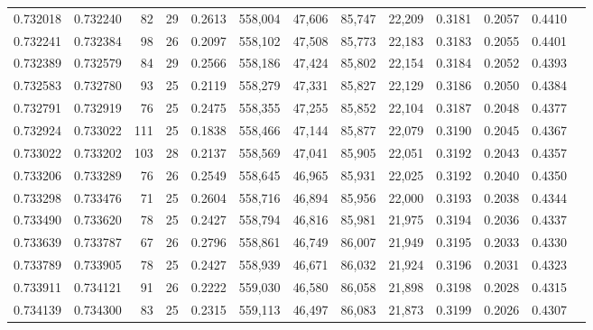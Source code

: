 \begin{tabular}{rrrrrrrrrrrrr}
0.732018 & 0.732240 &    82 &  29 &                                     0.2613 & 558,004 &  47,606 &  85,747 &  22,209 & 0.3181 & 0.2057 & 0.4410 \\
0.732241 & 0.732384 &    98 &  26 &                                     0.2097 & 558,102 &  47,508 &  85,773 &  22,183 & 0.3183 & 0.2055 & 0.4401 \\
0.732389 & 0.732579 &    84 &  29 &                                     0.2566 & 558,186 &  47,424 &  85,802 &  22,154 & 0.3184 & 0.2052 & 0.4393 \\
0.732583 & 0.732780 &    93 &  25 &                                     0.2119 & 558,279 &  47,331 &  85,827 &  22,129 & 0.3186 & 0.2050 & 0.4384 \\
0.732791 & 0.732919 &    76 &  25 &                                     0.2475 & 558,355 &  47,255 &  85,852 &  22,104 & 0.3187 & 0.2048 & 0.4377 \\
0.732924 & 0.733022 &   111 &  25 &                                     0.1838 & 558,466 &  47,144 &  85,877 &  22,079 & 0.3190 & 0.2045 & 0.4367 \\
0.733022 & 0.733202 &   103 &  28 &                                     0.2137 & 558,569 &  47,041 &  85,905 &  22,051 & 0.3192 & 0.2043 & 0.4357 \\
0.733206 & 0.733289 &    76 &  26 &                                     0.2549 & 558,645 &  46,965 &  85,931 &  22,025 & 0.3192 & 0.2040 & 0.4350 \\
0.733298 & 0.733476 &    71 &  25 &                                     0.2604 & 558,716 &  46,894 &  85,956 &  22,000 & 0.3193 & 0.2038 & 0.4344 \\
0.733490 & 0.733620 &    78 &  25 &                                     0.2427 & 558,794 &  46,816 &  85,981 &  21,975 & 0.3194 & 0.2036 & 0.4337 \\
0.733639 & 0.733787 &    67 &  26 &                                     0.2796 & 558,861 &  46,749 &  86,007 &  21,949 & 0.3195 & 0.2033 & 0.4330 \\
0.733789 & 0.733905 &    78 &  25 &                                     0.2427 & 558,939 &  46,671 &  86,032 &  21,924 & 0.3196 & 0.2031 & 0.4323 \\
0.733911 & 0.734121 &    91 &  26 &                                     0.2222 & 559,030 &  46,580 &  86,058 &  21,898 & 0.3198 & 0.2028 & 0.4315 \\
0.734139 & 0.734300 &    83 &  25 &                                     0.2315 & 559,113 &  46,497 &  86,083 &  21,873 & 0.3199 & 0.2026 & 0.4307 \\

\end{tabular}

